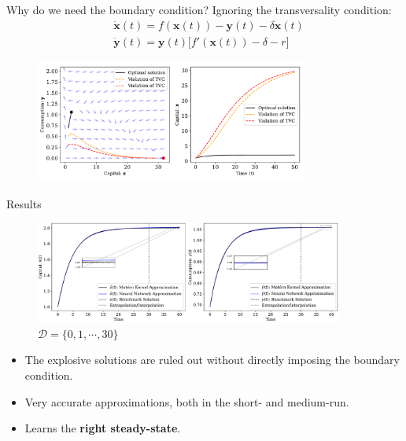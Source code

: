 \documentclass[aspectratio=169,10pt]{beamer}
\newcommand{\emphcolor}[1]{\textbf{\textcolor{emphcolorval}{#1}}}
\begin{document}
\begin{frame}{Why do we need the boundary condition?}
	Ignoring the transversality condition:
\begin{align*}
	&\dot{\mathbf{x}}(t) = f(\mathbf{x}(t)) - \mathbf{y}(t)-\delta \mathbf{x}(t)\\
	&\dot{\mathbf{y}}(t) = \mathbf{y}(t)\big[f'(\mathbf{x}(t)) -\delta -r\big]
\end{align*}
	\begin{figure}[t!]
		\centering
		\vspace{-4mm}
		\includegraphics[width=0.8\textwidth]{figs/TVC_violate.pdf}
		\vspace{-4mm}
	\end{figure}
\end{frame}


\begin{frame}{Results}
	\label{ncg:results}
		\begin{figure}[t!]
		\centering
		\includegraphics[width=0.9\textwidth]{figs/neoclassical_growth_model_2_by_1.pdf}
		\caption*{$\mathcal{D} = \{0,1,\cdots,30\}$}
		\vspace{-4mm}
	\end{figure}
	\begin{itemize}
		\item The explosive solutions are ruled out without directly imposing the boundary condition.
		\vspace{0.1in}
		\item Very accurate approximations, both in the short- and medium-run.
		\vspace{0.1in}
		\item Learns the  \emphcolor{right steady-state}. \hyperlink{errors}{}
	\end{itemize}
		
\end{frame}
\end{document}
